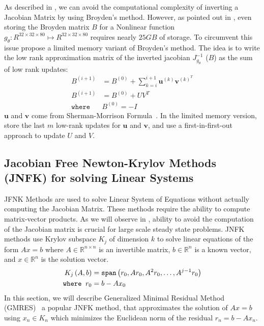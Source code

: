 As described in , we can avoid the computational complexity of inverting a Jacobian Matrix by using Broyden's method. However, as pointed out in \citet{bai_multiscale_2020}, even storing the Broyden matrix $B$ for a Nonlinear function $g_\theta: R^{32 \times 32 \times 80} \mapsto R^{32 \times 32 \times 80}$ requires nearly $25GB$ of storage. To circumvent this issue \citet{bai_multiscale_2020} propose a limited memory variant of Broyden's method. The idea is to write the low rank approximation matrix of the inverted jacobian $J^{-1}_{g_\theta}$ ($B$) as the sum of low rank updates:
%
\begin{align}
  B^{(i + 1)}     & = B^{(0)} + \sum_{k = i}^{i + 1} \mathbf{u}^{(k)} \mathbf{v}^{(k)^T} \\
  B^{(i + 1)}     & = B^{(0)} + UV^T                                                     \\
  \texttt{where } & B^{(0)} = -I
\end{align}
%
$\mathbf{u}$ and $\mathbf{v}$ come from Sherman-Morrison Formula~\citep{sherman1950adjustment}. In the limited memory version, \citet{bai_multiscale_2020} store the last $m$ low-rank updates for $\mathbf{u}$ and $\mathbf{v}$, and use a first-in-first-out approach to update $U$ and $V$.

\subsection{Jacobian Free Newton-Krylov Methods (JNFK) for solving Linear Systems}
\label{subsec:newton_krylov_methods}




JFNK Methods are used to solve Linear System of Equations without actually computing the Jacobian Matrix. These methods require the ability to compute matrix-vector products. As we will observe in , ability to avoid the computation of the Jacobian matrix is crucial for large scale steady state problems. JNFK methods use Krylov subspace $K_j$ of dimension $k$ to solve linear equations of the form $A x = b$  where $A \in \mathbb{R}^{n \times n}$ is an invertible matrix, $b \in \mathbb{R}^n$ is a known vector, and $x \in \mathbb{R}^n$ is the solution vector.
%
\begin{align}
  K_j\left(A, b\right)    & = \texttt{span}\left(r_0, Ar_0, A^2 r_0, \dots, A^{j-1} r_0\right)\label{eq:krylov_subspace} \\
  \texttt{where } r_0 & = b - A x_0
\end{align}
%
In this section, we will describe Generalized Minimal Residual Method (GMRES)~\citep{saad1986gmres} a popular JNFK method, that approximates the solution of $Ax = b$ using $x_n \in K_n$ which minimizes the Euclidean norm of the residual $r_n = b - A x_n$.

